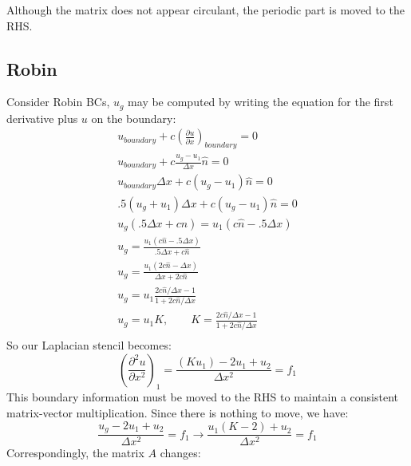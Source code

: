 \documentclass[landscape]{article}
\begin{document}
Although the matrix does not appear circulant, the periodic part is moved to the RHS.

\subsection{Robin}
Consider Robin BCs, $u_g$ may be computed by writing the equation for the first derivative plus $u$ on the boundary:
\begin{equation}\begin{aligned}
  u_{boundary} + c \left(\frac{\partial u}{\partial x}\right)_{boundary} = 0 \\
  u_{boundary} + c \frac{u_g - u_1}{\Delta x} \hat{n} = 0 \\
  u_{boundary} \Delta x + c (u_g - u_1) \hat{n} =  0 \\
  .5 (u_g + u_1) \Delta x + c (u_g - u_1) \hat{n} =  0 \\
  u_g (.5 \Delta x + c \hat{n}) = u_1 (c \hat{n} - .5 \Delta x) \\
  u_g = \frac{u_1 (c \hat{n} - .5 \Delta x)}{.5 \Delta x + c \hat{n}} \\
  u_g = \frac{u_1 (2 c \hat{n} - \Delta x)}{\Delta x + 2 c \hat{n}} \\
  u_g = u_1 \frac{2 c \hat{n}/\Delta x - 1}{1 + 2 c \hat{n}/\Delta x} \\
  u_g = u_1 K, \qquad K = \frac{2 c \hat{n}/\Delta x - 1}{1 + 2 c \hat{n}/\Delta x}  \\
\end{aligned}\end{equation}
So our Laplacian stencil becomes:
\begin{equation}
   \left(\frac{\partial^2 u}{\partial x^2}\right)_{1} =
   \frac{(K u_1) - 2 u_1 + u_{2}}{\Delta x^2} = f_1
\end{equation}
This boundary information must be moved to the RHS to maintain a consistent matrix-vector multiplication. Since there is nothing to move, we have:
\begin{equation}
   \frac{u_g - 2 u_1 + u_{2}}{\Delta x^2} = f_1
   \rightarrow
   \frac{u_1(K-2) + u_{2}}{\Delta x^2} = f_1
\end{equation}
Correspondingly, the matrix $A$ changes:
\end{document}
